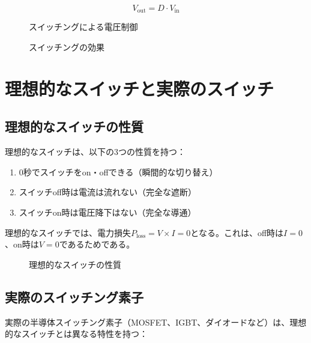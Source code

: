 \begin{equation}
V_{\text{out}} = D \cdot V_{\text{in}}
\end{equation}

\begin{figure}[H]
\centering
{}
\caption{スイッチングによる電圧制御}
\label{fig:switching_control}
\end{figure}

\begin{figure}[H]
\centering
{}
\caption{スイッチングの効果}
\label{fig:switching_effect}
\end{figure}

\section{理想的なスイッチと実際のスイッチ}

\subsection{理想的なスイッチの性質}

理想的なスイッチは、以下の3つの性質を持つ：

\begin{enumerate}
\item 0秒でスイッチをon・offできる（瞬間的な切り替え）
\item スイッチoff時は電流は流れない（完全な遮断）
\item スイッチon時は電圧降下はない（完全な導通）
\end{enumerate}

理想的なスイッチでは、電力損失$P_{\text{loss}} = V \times I = 0$となる。これは、off時は$I = 0$、on時は$V = 0$であるためである。

\begin{figure}[H]
\centering
{}
\caption{理想的なスイッチの性質}
\label{fig:ideal_switch}
\end{figure}

\subsection{実際のスイッチング素子}

実際の半導体スイッチング素子（MOSFET、IGBT、ダイオードなど）は、理想的なスイッチとは異なる特性を持つ：

